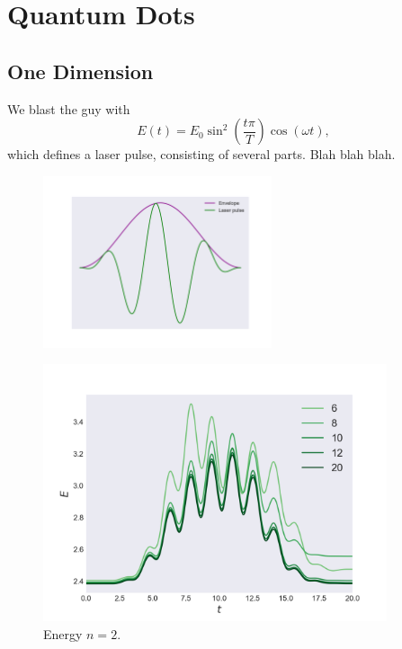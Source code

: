 \chapter{Quantum Dots}

\section{One Dimension}

We blast the guy with 
\begin{equation}
    E(t) = E_0\sin^2\left(\frac{t\pi}{T}\right)\cos(\omega t),
\end{equation}
which defines a laser pulse, consisting of several parts. Blah blah blah.

\begin{figure}
    \centering
    \includegraphics[width=0.6\textwidth]{results/figures/heaviside_laser.png} 
    \caption{}
    \label{fig:heaviside_laser}
\end{figure}

\begin{figure}
    \centering
    \includegraphics[width=0.9\textwidth]{results/figures/1D/n=2energy.png} 
    \caption{Energy $n=2$.}
    \label{fig:1d_n2_E}
\end{figure}


